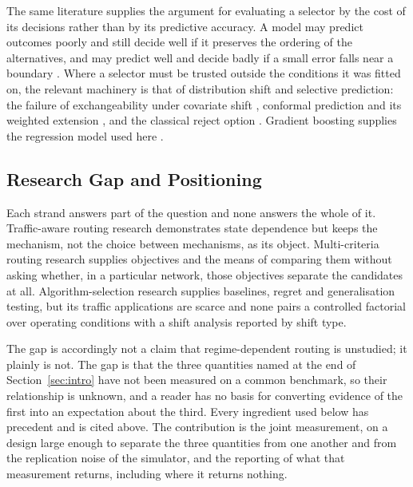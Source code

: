 The same literature supplies the argument for evaluating a selector by the cost
of its decisions rather than by its predictive accuracy. A model may predict
outcomes poorly and still decide well if it preserves the ordering of the
alternatives, and may predict well and decide badly if a small error falls near a
boundary \citep{elmachtoub2022spo}. Where a selector must be trusted outside the
conditions it was fitted on, the relevant machinery is that of distribution shift
and selective prediction: the failure of exchangeability under covariate shift
\citep{shimodaira2000}, conformal prediction and its weighted extension
\citep{vovk2005alrw,lei2018conformal,tibshirani2019covshift}, and the classical
reject option \citep{chow1970reject}. Gradient boosting supplies the regression
model used here \citep{friedman2001gbm,ke2017lightgbm}.

\subsection{Research Gap and Positioning}
\label{sec:gap}

Each strand answers part of the question and none answers the whole of it.
Traffic-aware routing research demonstrates state dependence but keeps the
mechanism, not the choice between mechanisms, as its object. Multi-criteria
routing research supplies objectives and the means of comparing them without
asking whether, in a particular network, those objectives separate the
candidates at all. Algorithm-selection research supplies baselines, regret and
generalisation testing, but its traffic applications are scarce and none pairs a
controlled factorial over operating conditions with a shift analysis reported by
shift type.

The gap is accordingly not a claim that regime-dependent routing is unstudied;
it plainly is not. The gap is that the three quantities named at the end of
Section~\ref{sec:intro} have not been measured on a common benchmark, so their
relationship is unknown, and a reader has no basis for converting evidence of the
first into an expectation about the third. Every ingredient used below has
precedent and is cited above. The contribution is the joint measurement, on a
design large enough to separate the three quantities from one another and from
the replication noise of the simulator, and the reporting of what that
measurement returns, including where it returns nothing.
